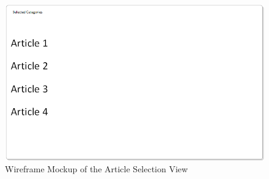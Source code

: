 \begin{figure}
	\caption{Wireframe Mockup of the Article Selection View}
	\label{fig:view2}
	\includegraphics[width=\textwidth]{Graphics/View2}
\end{figure}